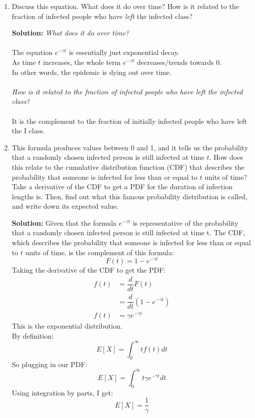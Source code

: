 \documentclass[11pt]{article}
\newenvironment{solution}{\par\noindent\begingroup\color{BrickRed}\textbf{Solution:} }{\par\endgroup}
\begin{document}
\begin{enumerate}
\begin{enumerate}[label=\alph*.]
	\item Discuss this equation. 
			What does it do over time?
			How is it related to the fraction of infected people who have {\it left} the infected class?
		\begin{solution} \newline \newline
			\textit{What does it do over time?} \\ \\
				The equation $e^{-\gamma t}$ is essentially just exponential decay. \\
				As time $t$ increases, the whole term $e^{-\gamma t}$ decreases/trends towards $0$. \\
				In other words, the epidemic is dying out over time. \\ \\
			\textit{How is it related to the fraction of infected people who have left the infected class?} \\ \\
				It is the complement to the fraction of initially infected people who have left the I class.
		\end{solution}
			
	\item This formula produces values between 0 and 1,
	and it tells us the probability that a randomly chosen infected person is still infected at time $t$.
	How does this relate to the cumulative distribution function (CDF) 
	that describes the probability that someone is infected for less than or equal to $t$ units of time? 
	Take a derivative of the CDF to get a PDF for the duration of infection lengths is. 
	Then, find out what this famous probability distribution is called, and write down its expected value.
		\begin{solution} \newline \newline
			Given that the formula $e^{-\gamma t}$ is representative of the probability that a randomly chosen infected person is still infected at time t.
			The CDF, which describes the probability that someone is infected for less than or equal to $t$ units of time, is the complement of this formula:
			$$F(t) = 1 - e^{-\gamma t}$$
			Taking the derivative of the CDF to get the PDF:
			\begin{align*}
			f(t) &= \dfrac{d}{dt} F(t) \\
				 &= \dfrac{d}{dt} (1 - e^{-\gamma t}) \\
			f(t) &= \gamma e^{-\gamma t}
			\end{align*}
			This is the exponential distribution. \\
			By definition:
			$$E[X] = \int_0^\infty t f(t) dt$$
			So plugging in our PDF:
			$$E[X] = \int_0^\infty t \gamma e^{-\gamma t} dt$$
			Using integration by parts, I get:
			$$E[X] = \frac{1}{\gamma}$$
		\end{solution}


\end{enumerate}
\end{enumerate}
\end{document}

